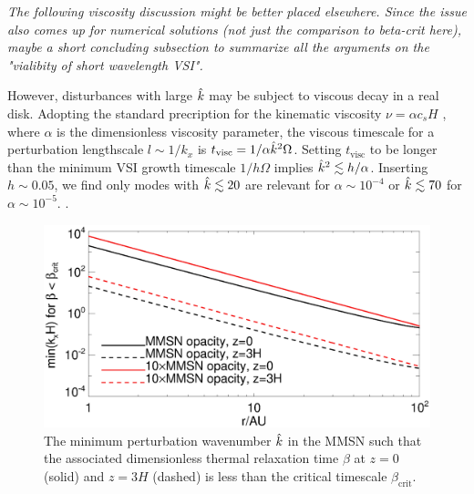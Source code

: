 
\emph{The following viscosity discussion might be better placed elsewhere.  Since the issue also comes up for numerical solutions (not just the comparison to beta-crit here), maybe a short concluding subsection to summarize all the arguments on the "vialibity of short wavelength VSI".}

However, disturbances with large $\hat{k}$ may be subject to viscous
decay in a real disk. Adopting the standard precription for the
kinematic viscosity $\nu = \alpha c_s H$ \citep{shakura73}, where
$\alpha$ is the dimensionless viscosity parameter, 
the viscous timescale for a perturbation lengthscale 
$l\sim 1/k_x$ is $t_\mathrm{visc} = 1/\alpha\hat{k}^2\Omega $. 
Setting $t_\mathrm{visc}$ to be longer than the
minimum VSI growth timescale $1/h\Omega$ implies 
$\hat{k}^2\lesssim h/\alpha$. Inserting $h \sim 0.05$,
we find only modes with $\hat{k}\lesssim 20$ are relevant for
$\alpha\sim 10^{-4}$ or $\hat{k}\lesssim 70$ for $\alpha\sim
10^{-5}$. .


\begin{figure}
  \includegraphics[width=\linewidth]{figures/bcrit_mink} 
  \caption{The minimum perturbation wavenumber $\hat{k}$ in
    the MMSN such that the associated dimensionless thermal
    relaxation time $\beta$ at $z=0$ (solid) and $z=3H$ (dashed) is
    less than the critical timescale $\beta_\mathrm{crit}$.   
    \label{mmsn_bcrit_bcool_mink}}   
\end{figure}  

